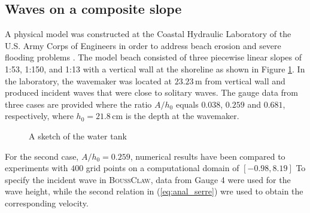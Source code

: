\documentclass[review]{elsarticle}
\newcommand{\BoussClawt}{\textsc{BoussClaw}}
\newcommand{\m}{\,\mathrm{m}}
\newcommand{\cm}{\,\mbox{cm}}
\begin{document}
\subsection{Waves on a composite slope}
\label{sec:comp_test}
A physical model was constructed at the Coastal Hydraulic Laboratory of the U.S. Army Corps of Engineers
in order to address beach erosion and severe flooding problems \citep{chl_bp5}. 
The model beach consisted of three piecewise linear slopes of 1:53, 1:150, and 1:13 with a vertical wall at the shoreline as shown in Figure \ref{fig:bp5_water_tank}.
In the laboratory, the wavemaker was located at $23.23\m$ from vertical wall and produced incident waves that were close to solitary waves.
The gauge data from three cases are provided 
where the ratio $A/h_0$ equals  $0.038$, $0.259$ and $0.681$, respectively,
where $h_0=21.8\cm$ is  the depth at the wavemaker.

\begin{figure}[!htb]
\centering
{}
  \caption{A sketch of the water tank}
  \label{fig:bp5_water_tank}
\end{figure}

For the second case, $A/h_0=0.259$, numerical results 
have been compared to experiments
with $400$ grid points on a computational domain of $[-0.98,8.19]$
To specify the incident wave in \BoussClawt, 
data from Gauge 4 were used for the wave height,
while the second relation in (\ref{eq:anal_serre})
wre used to obtain  the corresponding velocity.
\end{document}
